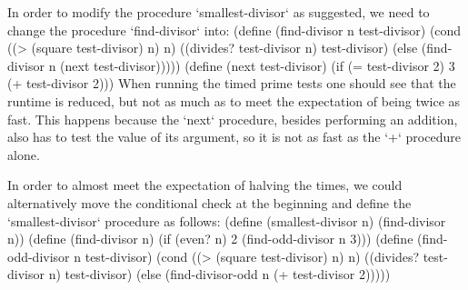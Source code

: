 In order to modify the procedure `smallest-divisor` as suggested, we need to change the procedure `find-divisor` into:
\begtt\scm
(define (find-divisor n test-divisor)
  (cond ((> (square test-divisor) n) n)
        ((divides? test-divisor n) test-divisor)
        (else (find-divisor n (next test-divisor)))))
(define (next test-divisor)
  (if (= test-divisor 2)
      3
      (+ test-divisor 2)))
\endtt
When running the timed prime tests one should see that the runtime is reduced, but not as much as to meet the expectation of being twice as fast.  This happens because the `next` procedure, besides performing an addition, also has to test the value of its argument, so it is not as fast as the `+` procedure alone. 

In order to almost meet the expectation of halving the times, we could alternatively move the conditional check at the beginning and define the `smallest-divisor` procedure as follows:
\begtt\scm
(define (smallest-divisor n) (find-divisor n))
(define (find-divisor n)
  (if (even? n) 2 (find-odd-divisor n 3)))
(define (find-odd-divisor n test-divisor)
  (cond ((> (square test-divisor) n) n)
        ((divides? test-divisor n) test-divisor)
        (else (find-divisor-odd n (+ test-divisor 2)))))
\endtt
